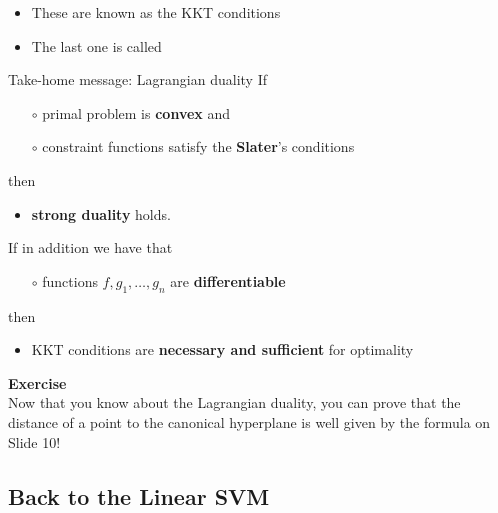 \documentclass[xcolor={usenames,dvipsnames}]{beamer}
\begin{document}
\begin{frame}{}
    \begin{itemize}
    \item These are known as the \alert{KKT conditions}
    \item The last one is called 
  \end{itemize}
  \begin{block}{Take-home message: Lagrangian duality}
 If
  \begin{itemize}
    \item[$\circ$] primal problem is \textbf{convex} and
    \item[$\circ$] constraint functions satisfy the \textbf{Slater}'s conditions
  \end{itemize}
  then
  \begin{itemize}
     \item \textbf{strong duality} holds. 
   \end{itemize} 

  \bigskip
  If in addition we have that
  \begin{itemize}
    \item[$\circ$] functions $f, g_1, \ldots, g_n$ are \textbf{differentiable}
  \end{itemize}
  then
  \begin{itemize}
    \item KKT conditions are \textbf{necessary and sufficient} for optimality
  \end{itemize}
  \end{block}
\end{frame}

\begin{frame}
\textbf{Exercise} \\
Now that you know about the Lagrangian duality, you can prove that the distance of a point to the canonical hyperplane is well given by the formula on Slide 10!
\end{frame}



\subsection{Back to the Linear SVM} 
\end{document}
